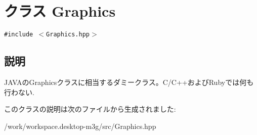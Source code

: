 \hypertarget{classm3g_1_1Graphics}{
\section{クラス Graphics}
\label{classm3g_1_1Graphics}
}
{\tt \#include $<$Graphics.hpp$>$}



\subsection{説明}
JAVAのGraphicsクラスに相当するダミークラス。C/C++およびRubyでは何も行わない. 

このクラスの説明は次のファイルから生成されました:\begin{CompactItemize}
\item 
/work/workspace.desktop-m3g/src/Graphics.hpp\end{CompactItemize}
